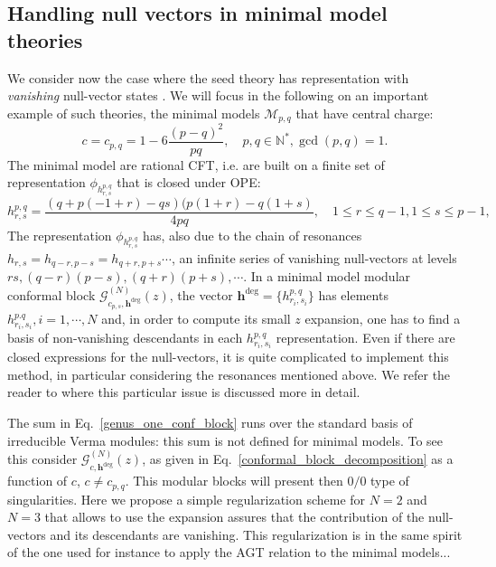 \documentclass[a4paper,11pt]{article}
\begin{document}
\subsection{Handling null vectors in minimal model theories }
\label{null_vec1}
We consider now the case where the seed theory has representation with {\it vanishing} null-vector states \cite{BPZ}. 
We will focus in the following on an  important example of such theories, the minimal models $\mathcal{M}_{p,q}$ that have central  charge:
\begin{equation}
c=c_{p,q}= 1 -6\frac{ (p-q)^2}{p q}, \quad p,q \in \mathbb{N}^*, \gcd(p,q)=1.
\end{equation}
 The minimal model are rational CFT, i.e. are built on a  finite set of representation $\phi_{h^{p,q}_{r,s}}$ that is closed under OPE:
 \begin{equation}
 h^{p,q}_{r,s}=\frac{(q + p (-1 + r) - q s) (p (1 + r) - q (1 + s)}{4 p q}, \quad 1\leq r\leq q-1,  1\leq s\leq p-1,
 \end{equation}
 The representation $\phi_{h^{p,q}_{r,s}}$ has, also due to the chain of resonances $h_{r,s}=h_{q-r,p-s}=h_{q+r,p+s}\cdots$, an infinite series of vanishing null-vectors at levels $r s, (q-r)(p-s),(q+r)(p+s), \cdots$. In a minimal model modular conformal block $\mathcal{G}_{c_{p,s}, \boldsymbol{h}^{\text{deg}}}^{(N)}(z)$, the vector $\boldsymbol{h}^{\text{deg}}=\{h^{p,q}_{r_i,s_i}\}$ has elements $h^{p.q}_{r_i,s_i}, i=1,\cdots,N$ and, in  order to compute its small $z$ expansion, one has to find a basis of non-vanishing descendants in  each $h^{p,q}_{r_i,s_i}$ representation. Even if there are closed expressions for the null-vectors, it is quite complicated to implement this method, in particular considering the resonances mentioned above. We refer the reader to \cite{Javerzat} where this particular issue is discussed more in detail. 
 
\noindent The sum in Eq.~\eqref{genus_one_conf_block} runs over  the standard basis of irreducible Verma modules: this sum  is not defined for minimal models. To see this consider  $\mathcal{G}_{c, \boldsymbol{h}^{\text{deg}}}^{(N)}(z)$, as given in Eq.~\eqref{conformal_block_decomposition} as a function of $c$, $c\neq c_{p,q}$.  This modular blocks  will present then $0/0$ type of singularities. Here we propose a simple regularization scheme for $N=2$ and $N=3$ that allows to use the expansion  assures that the contribution of the null-vectors and its descendants are  vanishing. This regularization is in the same spirit of the one used for instance to apply the AGT relation to the minimal models...
\end{document}
